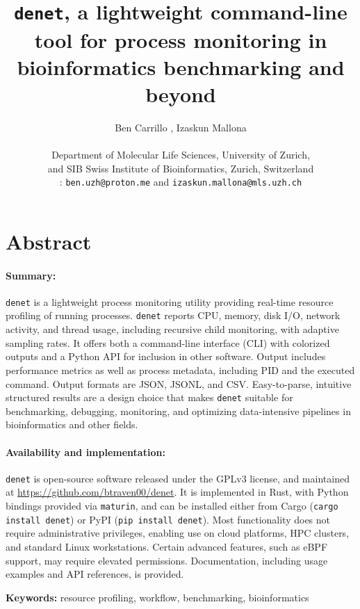 \documentclass[10pt]{article}
\title{\texttt{denet}, a lightweight command-line tool for process monitoring in bioinformatics benchmarking and beyond}
\author{Ben Carrillo \orcidlink{0009-0003-5704-4151}, Izaskun Mallona \orcidlink{0000-0002-2853-7526}\\
\\
Department of Molecular Life Sciences, University of Zurich,\\
and SIB Swiss Institute of Bioinformatics, Zurich, Switzerland \\ 
{ \Letter: \texttt{ben.uzh@proton.me} and \texttt{izaskun.mallona@mls.uzh.ch}}
}
\date{}
\begin{document}
\maketitle
	
\section*{Abstract} %

\paragraph{Summary:} \texttt{denet} is a lightweight process monitoring utility providing real-time resource profiling of running processes. \texttt{denet} reports CPU, memory, disk I/O, network activity, and thread usage, including recursive child monitoring, with adaptive sampling rates. It offers both a command-line interface (CLI) with colorized outputs and a Python API for inclusion in other software. Output includes performance metrics as well as process metadata, including PID and the executed command. Output formats are JSON, JSONL, and CSV.  Easy-to-parse, intuitive structured results are a design choice that makes \texttt{denet} suitable for benchmarking, debugging, monitoring, and optimizing data-intensive pipelines in bioinformatics and other fields. 

\paragraph{Availability and implementation:} \texttt{denet} is open-source software released under the GPLv3 license, and maintained at \url{https://github.com/btraven00/denet}. It is implemented in Rust, with Python bindings provided via \texttt{maturin}, and can be installed either from Cargo (\texttt{cargo install denet}) or PyPI (\texttt{pip install denet}). Most functionality does not require administrative privileges, enabling use on cloud platforms, HPC clusters, and standard Linux workstations. Certain advanced features, such as eBPF support, may require elevated permissions. Documentation, including usage examples and API references, is provided.

\vspace{0.5cm}

\noindent\textbf{Keywords:} resource profiling, workflow, benchmarking, bioinformatics
\end{document}
